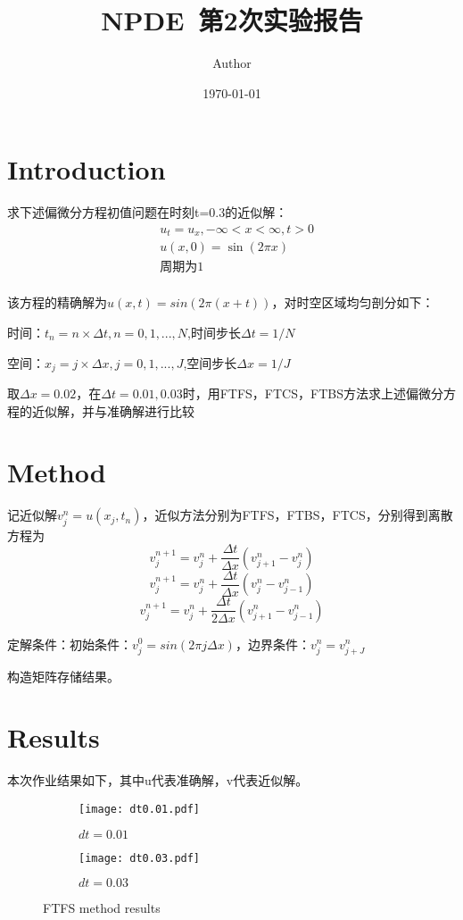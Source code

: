 \documentclass{article}
\title{NPDE~第2次实验报告}
\author{Author}
\date{\today}
\begin{document}
\maketitle

\section{Introduction}

求下述偏微分方程初值问题在时刻t=0.3的近似解：
$$
\begin{aligned}
  & u_t=u_x,-\infty<x<\infty,t>0 \\
  & u(x,0)=\sin(2\pi x)           \\
  & \text{周期为1}                  \\
\end{aligned}
$$

该方程的精确解为$u(x,t)=sin(2\pi(x+t))$，对时空区域均匀剖分如下：

时间：$t_n=n\times \Delta t,n=0,1,...,N$,时间步长$\Delta t=1/N$

空间：$x_j=j\times \Delta x,j=0,1,...,J$,空间步长$\Delta x=1/J$

取$\Delta x =0.02$，在$\Delta t=0.01,0.03$时，用FTFS，FTCS，FTBS方法求上述偏微分方程的近似解，并与准确解进行比较
\section{Method}

记近似解$v_j^n=u(x_j,t_n)$，近似方法分别为FTFS，FTBS，FTCS，分别得到离散方程为
$$v_j^{n+1}=v_j^n+\frac{\Delta t}{\Delta x}(v_{j+1}^n-v_{j}^n)$$
$$v_j^{n+1}=v_j^n+\frac{\Delta t}{\Delta x}(v_{j}^n-v_{j-1}^n)$$
$$v_j^{n+1}=v_j^n+\frac{\Delta t}{2\Delta x}(v_{j+1}^n-v_{j-1}^n)$$

定解条件：初始条件：$v_j^0=sin(2\pi j\Delta x)$，边界条件：$v_j^n=v_{j+J}^n$

构造矩阵存储结果。
\section{Results}

本次作业结果如下，其中u代表准确解，v代表近似解。

\begin{figure}[H]
  \centering
  \begin{subfigure}[b]{0.47\textwidth}
    \centering
    \texttt{[image: dt0.01.pdf]}
    \caption{$dt=0.01$}

  \end{subfigure}
  \begin{subfigure}[b]{0.47\textwidth}
    \centering
    \texttt{[image: dt0.03.pdf]}
    \caption{$dt=0.03$}

  \end{subfigure}
  \caption{FTFS method results}
\end{figure}
\end{document}
